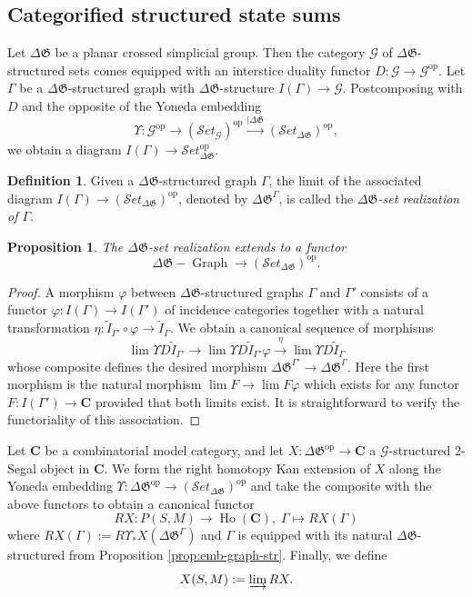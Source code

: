 \documentclass[english,11pt,leqno]{article}
\def\Gen{\mathfrak{G}}
\def\Cb{\mathbf{C}}
\def\Ho{\operatorname{Ho}}
\def\on{\operatorname}
\def\lra{\longrightarrow}
\def\ind{\varinjlim{}}
\def\op{{\operatorname{op}}}
\def\Set{ {\mathcal Set}}
\def\Set{ {\mathcal Set}}
\def\G{ {\mathcal G}}
\def\DGgraph{\DG-\on{Graph}}
\def\DG{ {\Delta \Gen}}
\newtheorem{prop}[thm]{Proposition}
\theoremstyle{definition}
\newtheorem{defi}[thm]{Definition}
\theoremstyle{remark}
\numberwithin{equation}{section}
\begin{document}
\subsection{Categorified structured state sums}

Let $\DG$ be a planar crossed simplicial group. Then the category $\G$ of $\DG$-structured sets
comes equipped with an interstice duality functor $D: \G \to \G^{\op}$.
Let $\Gamma$ be a $\DG$-structured graph with $\DG$-structure $I(\Gamma) \to \G$. Postcomposing with $D$
and the opposite of the Yoneda embedding 
\[
  \Upsilon: \G^{\op} \lra (\Set_{\G})^{\op} \overset{|\DG}{\lra} (\Set_{\DG})^{\op},
\]
we obtain a diagram $I(\Gamma) \to \Set_{\DG}^{\op}$. 

\begin{defi} Given a $\DG$-structured graph $\Gamma$, the limit of the associated diagram $I(\Gamma) \to
	(\Set_{\DG})^{\op}$, denoted by $\DG^{\Gamma}$, is called the {\em $\DG$-set realization of $\Gamma$}. 
\end{defi}

\begin{prop} The $\DG$-set realization extends to a functor
	\[
		\DGgraph \lra (\Set_{\DG})^{\op}.
	\]
\end{prop}
\begin{proof} A morphism $\varphi$ between $\DG$-structured graphs $\Gamma$ and $\Gamma'$ consists of a functor
	$\varphi: I(\Gamma) \to I(\Gamma')$ of incidence categories together with 
	a natural transformation $\eta: \widetilde{I}_{\Gamma'} \circ \varphi \to
	\widetilde{I}_\Gamma$. We obtain a canonical sequence of morphisms
	\[
		\lim \Upsilon D \widetilde{I}_{\Gamma'} \lra 
		\lim \Upsilon D \widetilde{I}_{\Gamma'} \varphi \overset{\eta}{\lra}
		\lim \Upsilon D \widetilde{I}_{\Gamma}
	\]
	whose composite defines the desired morphism $\DG^{\Gamma'} \to \DG^{\Gamma}$. Here the first
	morphism is the natural morphism $\lim F \to \lim F \varphi$ which exists for any
	functor $F: I(\Gamma') \to \Cb$ provided that both limits exist. It is straightforward to
	verify the functoriality of this association.
\end{proof}

Let $\Cb$ be a combinatorial model category, and let $X: \DG^{\op} \to \Cb$ a $\G$-structured
$2$-Segal object in $\Cb$. We form the right homotopy Kan extension of $X$ along the Yoneda embedding 
$\Upsilon: \DG^{\op} \to (\Set_{\DG})^{\op}$ and take the composite with the above functors 
to obtain a canonical functor
\begin{equation}\label{eq:RX}
	RX: P(S,M) \lra \Ho(\Cb),\; \Gamma \mapsto RX({\Gamma})
\end{equation}
where $RX(\Gamma) := R \Upsilon_*X (\DG^{\Gamma})$ and $\Gamma$ is equipped with its natural
$\DG$-structured from Proposition \ref{prop:emb-graph-str}. Finally, we define
\[
	X(S,M) := \ind RX.
\]
\end{document}
